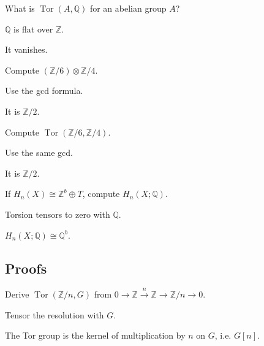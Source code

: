 \begin{exercise}\label{exr:viii26-ped-02}
What is $\operatorname{Tor}(A,\mathbb Q)$ for an abelian group $A$?
\end{exercise}
\begin{hint}
$\mathbb Q$ is flat over $\mathbb Z$.
\end{hint}
\begin{solution}
It vanishes.
\end{solution}

\begin{exercise}\label{exr:viii26-ped-03}
Compute $(\mathbb Z/6)\otimes\mathbb Z/4$.
\end{exercise}
\begin{hint}
Use the gcd formula.
\end{hint}
\begin{solution}
It is $\mathbb Z/2$.
\end{solution}

\begin{exercise}\label{exr:viii26-ped-04}
Compute $\operatorname{Tor}(\mathbb Z/6,\mathbb Z/4)$.
\end{exercise}
\begin{hint}
Use the same gcd.
\end{hint}
\begin{solution}
It is $\mathbb Z/2$.
\end{solution}

\begin{exercise}\label{exr:viii26-ped-05}
If $H_n(X)\cong\mathbb Z^b\oplus T$, compute $H_n(X;\mathbb Q)$.
\end{exercise}
\begin{hint}
Torsion tensors to zero with $\mathbb Q$.
\end{hint}
\begin{solution}
$H_n(X;\mathbb Q)\cong\mathbb Q^b$.
\end{solution}

\subsection*{Proofs}

\begin{exercise}\label{exr:viii26-ped-06}
Derive $\operatorname{Tor}(\mathbb Z/n,G)$ from $0\to\mathbb Z\xrightarrow{n}\mathbb Z\to\mathbb Z/n\to0$.
\end{exercise}
\begin{hint}
Tensor the resolution with $G$.
\end{hint}
\begin{solution}
The Tor group is the kernel of multiplication by $n$ on $G$, i.e. $G[n]$.
\end{solution}

